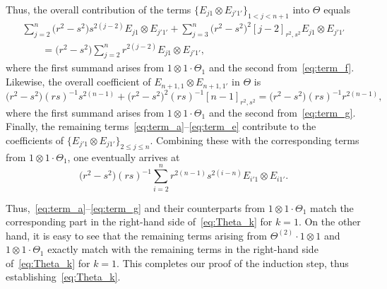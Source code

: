\documentclass[10pt,a4paper]{amsart}
\numberwithin{equation}{section}
\begin{document}
Thus, the overall contribution of the terms $\{E_{j1} \otimes E_{j'1'}\}_{1<j<n+1}$ into $\Theta$ equals
\begin{gather*}
 \sum_{j = 2}^{n} \bigl(r^{2} - s^{2}\bigr)s^{2(j-2)} E_{j1} \otimes E_{j'1'} +
 \sum_{j = 3}^{n}\bigl(r^{2} - s^{2}\bigr)^{2}[j - 2]_{r^{2},s^{2}} E_{j1} \otimes E_{j'1'}\\
 \qquad{} = \bigl(r^{2} - s^{2}\bigr)\sum_{j = 2}^{n}r^{2(j - 2)}E_{j1} \otimes E_{j'1'},
\end{gather*}
where the first summand arises from $1 \otimes 1 \cdot \Theta_{1}$ and the second from~\eqref{eq:term_f}.
Likewise, the overall coefficient of $E_{n + 1,1} \otimes E_{n + 1,1'}$ in $\Theta$ is
\begin{displaymath}
 \bigl(r^{2} - s^{2}\bigr)(rs)^{-1}s^{2(n-1)} + \bigl(r^{2} - s^{2}\bigr)^{2}(rs)^{-1}[n-1]_{r^{2},s^{2}}=
 \bigl(r^{2} - s^{2}\bigr)(rs)^{-1}r^{2(n - 1)},
\end{displaymath}
where the first summand arises from $1 \otimes 1 \cdot \Theta_{1}$ and the second from~\eqref{eq:term_g}.
Finally, the remaining terms~\eqref{eq:term_a}--\eqref{eq:term_e} contribute to the coefficients of $\{E_{j'1} \otimes E_{j1'}\}_{2\leq j\leq n}$. Combining these with the corresponding terms from $1 \otimes 1 \cdot \Theta_{1}$, one eventually arrives at
\begin{displaymath}
 \bigl(r^{2} - s^{2}\bigr)(rs)^{-1} \sum_{i = 2}^{n} r^{2(n - 1)}s^{2(i-n)} E_{i'1} \otimes E_{i1'}.
\end{displaymath}

Thus,~\eqref{eq:term_a}--\eqref{eq:term_g} and their counterparts from $1 \otimes 1 \cdot \Theta_{1}$ match the corresponding part in the right-hand side of~\eqref{eq:Theta_k} for $k=1$. On the other hand, it is easy to see that the remaining terms arising from $\Theta^{(2)} \cdot 1 \otimes 1$ and $1 \otimes 1 \cdot \Theta_{1}$ exactly match with the remaining terms in the right-hand side of~\eqref{eq:Theta_k} for $k=1$. This completes our proof of the induction step, thus establishing~\eqref{eq:Theta_k}.
\end{document}
